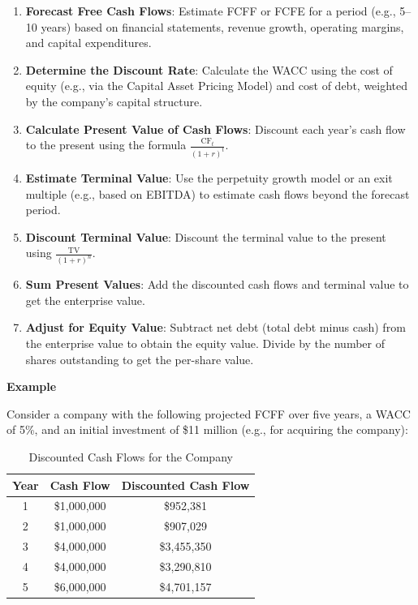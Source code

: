 \documentclass[12pt]{article}
\begin{document}
\begin{enumerate}
    \item \textbf{Forecast Free Cash Flows}: Estimate FCFF or FCFE for a period (e.g., 5–10 years) based on financial statements, revenue growth, operating margins, and capital expenditures.
    \item \textbf{Determine the Discount Rate}: Calculate the WACC using the cost of equity (e.g., via the Capital Asset Pricing Model) and cost of debt, weighted by the company's capital structure.
    \item \textbf{Calculate Present Value of Cash Flows}: Discount each year's cash flow to the present using the formula \(\frac{\text{CF}_t}{(1 + r)^t}\).
    \item \textbf{Estimate Terminal Value}: Use the perpetuity growth model or an exit multiple (e.g., based on EBITDA) to estimate cash flows beyond the forecast period.
    \item \textbf{Discount Terminal Value}: Discount the terminal value to the present using \(\frac{\text{TV}}{(1 + r)^n}\).
    \item \textbf{Sum Present Values}: Add the discounted cash flows and terminal value to get the enterprise value.
    \item \textbf{Adjust for Equity Value}: Subtract net debt (total debt minus cash) from the enterprise value to obtain the equity value. Divide by the number of shares outstanding to get the per-share value.
\end{enumerate}

\textbf{Example}

Consider a company with the following projected FCFF over five years, a WACC of 5\%, and an initial investment of \$11 million (e.g., for acquiring the company):

\begin{table}[h]
\centering
\begin{tabular}{|c|c|c|}
\hline
\textbf{Year} & \textbf{Cash Flow} & \textbf{Discounted Cash Flow} \\
\hline
1 & \$1,000,000 & \$952,381 \\
2 & \$1,000,000 & \$907,029 \\
3 & \$4,000,000 & \$3,455,350 \\
4 & \$4,000,000 & \$3,290,810 \\
5 & \$6,000,000 & \$4,701,157 \\
\hline
\end{tabular}
\caption{Discounted Cash Flows for the Company}
\end{table}
\end{document}
